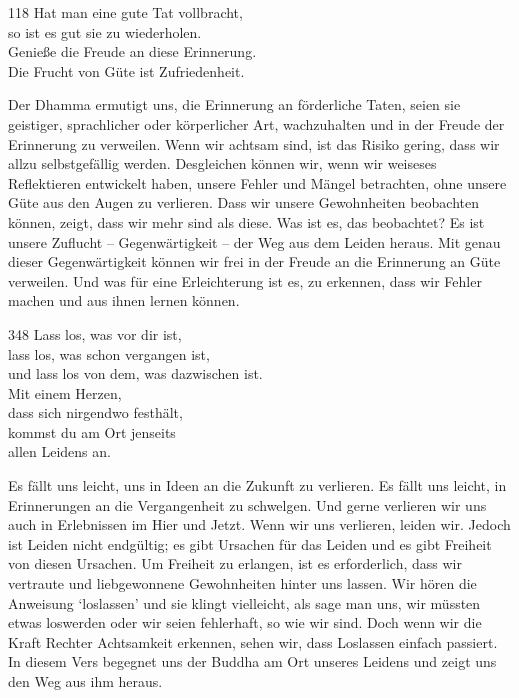 
\begin{dhpVerse}{118}
\label{dhp-118}
Hat man eine gute Tat vollbracht,\\ 
so ist es gut sie zu wiederholen.\\ 
Genieße die Freude an diese Erinnerung.\\ 
Die Frucht von Güte ist Zufriedenheit. 
\end{dhpVerse}

\begin{dhpRefl}

Der Dhamma ermutigt uns, die Erinnerung an förderliche Taten, seien sie
geistiger, sprachlicher oder körperlicher Art, wachzuhalten und in der Freude
der Erinnerung zu verweilen. Wenn wir achtsam sind, ist das Risiko gering,
dass wir allzu selbstgefällig werden. Desgleichen können wir, wenn wir
weiseses Reflektieren entwickelt haben, unsere Fehler und Mängel betrachten,
ohne unsere Güte aus den Augen zu verlieren. Dass wir unsere Gewohnheiten
beobachten können, zeigt, dass wir mehr sind als diese. Was ist es, das
beobachtet? Es ist unsere Zuflucht -- Gegenwärtigkeit -- der Weg aus dem
Leiden heraus. Mit genau dieser Gegenwärtigkeit können wir frei in der Freude
an die Erinnerung an Güte verweilen. Und was für eine Erleichterung ist es, zu
erkennen, dass wir Fehler machen und aus ihnen lernen können.

\end{dhpRefl}


\begin{dhpVerse}{348}
\label{dhp-348}
Lass los, was vor dir ist,\\ 
lass los, was schon vergangen ist,\\ 
und lass los von dem, was dazwischen ist.\\ 
Mit einem Herzen,\\ 
dass sich nirgendwo festhält,\\ 
kommst du am Ort jenseits\\ 
allen Leidens an. 
\end{dhpVerse}

\begin{dhpRefl}

Es fällt uns leicht, uns in Ideen an die Zukunft zu verlieren. Es fällt uns
leicht, in Erinnerungen an die Vergangenheit zu schwelgen. Und gerne verlieren
wir uns auch in Erlebnissen im Hier und Jetzt. Wenn wir uns verlieren, leiden
wir. Jedoch ist Leiden nicht endgültig; es gibt Ursachen für das Leiden und es
gibt Freiheit von diesen Ursachen. Um Freiheit zu erlangen, ist es
erforderlich, dass wir vertraute und liebgewonnene Gewohnheiten hinter uns
lassen. Wir hören die Anweisung `loslassen' und sie klingt vielleicht, als
sage man uns, wir müssten etwas loswerden oder wir seien fehlerhaft, so wie
wir sind. Doch wenn wir die Kraft Rechter Achtsamkeit erkennen, sehen wir,
dass Loslassen einfach passiert. In diesem Vers begegnet uns der Buddha am Ort
unseres Leidens und zeigt uns den Weg aus ihm heraus.

\end{dhpRefl}

